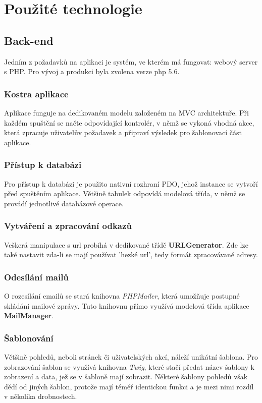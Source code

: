 \documentclass[12pt,a4paper]{article}
\let\oldsection\section
\renewcommand\section{\clearpage\oldsection}
\begin{document}
{\section{Použité technologie}}
{\subsection{Back-end}}
Jedním z požadavků na aplikaci je systém, ve kterém má fungovat: webový server s PHP. Pro vývoj a produkci byla zvolena verze php 5.6.
{\subsubsection{Kostra aplikace}}
Aplikace funguje na dedikovaném modelu založeném na MVC architektuře. Při každém spuštění se načte odpovídající kontrolér, v němž se vykoná vhodná akce, která zpracuje uživatelův požadavek a připraví výsledek pro šablonovací část aplikace.
{\subsubsection{Přístup k databázi}}
Pro přístup k databázi je použito nativní rozhraní PDO, jehož instance se vytvoří před spuštěním aplikace. Většině tabulek odpovídá modelová třída, v němž se provádí jednotlivé databázové operace.
{\subsubsection{Vytváření a zpracování odkazů}}
Veškerá manipulace s url probíhá v dedikované třídě \textbf{URLGenerator}. Zde lze také nastavit zda-li se mají používat 'hezké url', tedy formát zpracovávané adresy.
{\subsubsection{Odesílání mailů}}
O rozesílání emailů se stará knihovna \textit{PHPMailer}, která umožňuje postupné skládání mailové zprávy. Tuto knihovnu přímo využívá modelová třída aplikace \textbf{MailManager}.
{\subsubsection{Šablonování}}
Většině pohledů, neboli stránek či uživatelských akcí, náleží unikátní šablona. Pro zobrazování šablon se využívá knihovna \textit{Twig}, které stačí předat název šablony k zobrazení a data, jež se v šabloně mají zobrazit. Některé šablony pohledů však dědí od jiných šablon, protože mají téměř identickou funkci a je mezi nimi rozdíl v několika drobnostech.
\end{document}
